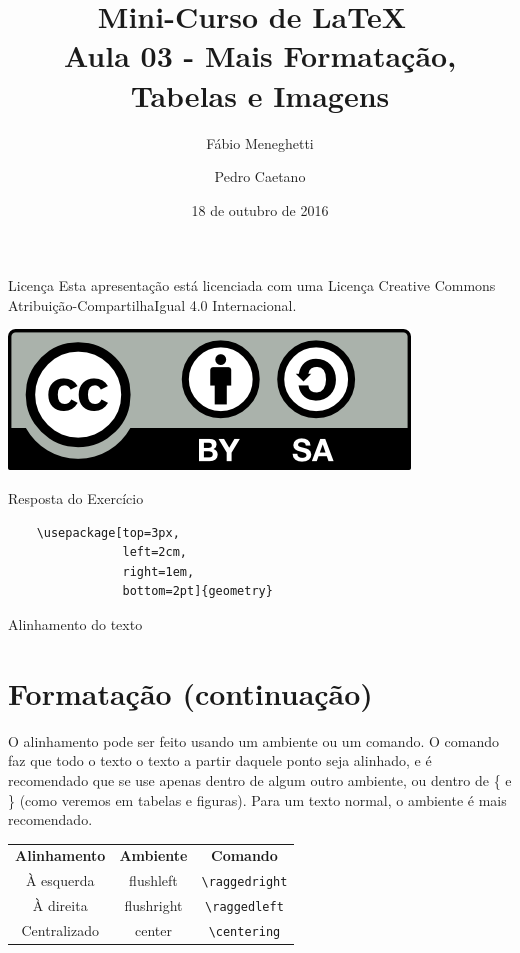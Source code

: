 \documentclass[12pt]{beamer}
\title{Mini-Curso de \LaTeX\ \\ Aula 03 - Mais Formatação, Tabelas e Imagens}
\author{Fábio Meneghetti \and Pedro Caetano}
\date{18 de outubro de 2016}
\begin{document}
\begin{frame}
  \titlepage
\end{frame}

\begin{frame}{Licença}
  Esta apresentação está licenciada com uma Licença Creative Commons Atribuição-CompartilhaIgual 4.0 Internacional.
  \begin{center}
    \includegraphics[scale=0.3]{../license.png}
  \end{center}
\end{frame}

\begin{frame}[fragile]{Resposta do Exercício}

  \begin{verbatim}
    \usepackage[top=3px,
                left=2cm,
                right=1em,
                bottom=2pt]{geometry}
  \end{verbatim}

\end{frame}

\begin{frame}
  \tableofcontents
\end{frame}

\begin{frame}[fragile]{Alinhamento do texto}
  \section{Formatação (continuação)}
  O alinhamento pode ser feito usando um ambiente ou um comando. O comando faz que todo o texto o texto a partir daquele ponto seja alinhado, e é recomendado que se use apenas dentro de algum outro ambiente, ou dentro de \{ e \} (como veremos em tabelas e figuras). Para um texto normal, o ambiente é mais recomendado.
  \begin{center}
    \begin{tabular}{ccc}
    \textbf{Alinhamento} & \textbf{Ambiente} & \textbf{Comando}\\
    À esquerda & flushleft & \verb+\raggedright+\\
    À direita & flushright & \verb+\raggedleft+\\
    Centralizado & center & \verb+\centering+\\
    \end{tabular}
  \end{center}
\end{frame}
\end{document}
